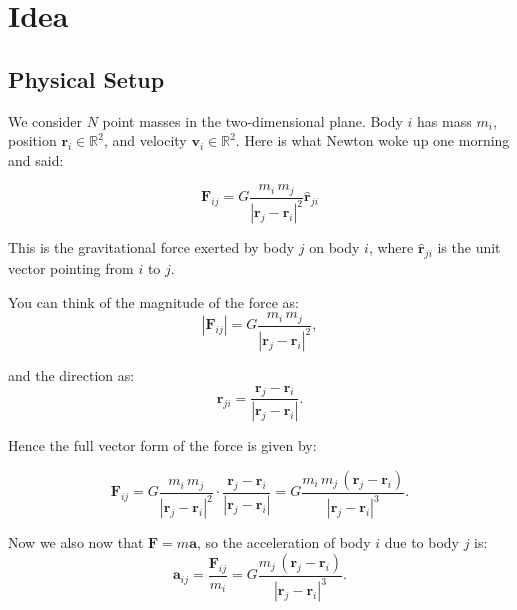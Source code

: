 \documentclass[11pt, a4paper]{article}
\begin{document}

\section{Idea}

\subsection{Physical Setup}

We consider $N$ point masses in the two-dimensional plane.
Body $i$ has mass $m_i$, position $\mathbf{r}_i \in \mathbb{R}^2$, and velocity $\mathbf{v}_i \in \mathbb{R}^2$.
Here is what Newton woke up one morning and said:

\begin{equation}
       \mathbf{F}_{ij} = G \frac{m_i\,m_j}{|\mathbf{r}_j - \mathbf{r}_i|^2}\hat{\mathbf{r}}_{ji}
       \label{eq:force}
\end{equation}

This is the gravitational force exerted by body $j$ on body $i$, where $\hat{\mathbf{r}}_{ji}$ is the unit vector pointing from $i$ to $j$.

You can think of the magnitude of the force as:
\begin{equation}
    |\mathbf{F}_{ij}| = G \frac{m_i\,m_j}{|\mathbf{r}_j - \mathbf{r}_i|^2},
\end{equation}

and the direction as:
\begin{equation}
       \hat{\mathbf{r}}_{ji} = \frac{\mathbf{r}_j - \mathbf{r}_i}{|\mathbf{r}_j - \mathbf{r}_i|}.
\end{equation}

Hence the full vector form of the force is given by:

\begin{equation}
    \mathbf{F}_{ij} = G \frac{m_i\,m_j}{|\mathbf{r}_j - \mathbf{r}_i|^2} \cdot \frac{\mathbf{r}_j - \mathbf{r}_i}{|\mathbf{r}_j - \mathbf{r}_i|}
    = G \frac{m_i\,m_j\,(\mathbf{r}_j - \mathbf{r}_i)}{|\mathbf{r}_j - \mathbf{r}_i|^3}.
\end{equation}

Now we also now that $\mathbf{F} = m \mathbf{a}$, so the acceleration of body $i$ due to body $j$ is:
\begin{equation}
    \mathbf{a}_{ij} = \frac{\mathbf{F}_{ij}}{m_i} = G \frac{m_j\,(\mathbf{r}_j - \mathbf{r}_i)}{|\mathbf{r}_j - \mathbf{r}_i|^3}.
\end{equation}
\end{document}
